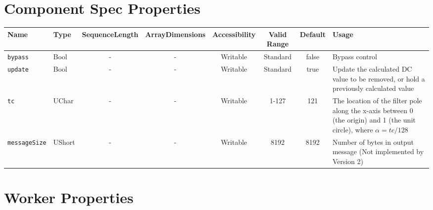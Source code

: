 \documentclass{article}
\begin{document}
\begin{landscape}
\section*{Component Spec Properties}
\begin{scriptsize}
	\begin{tabular}{|p{3cm}|p{1.5cm}|c|c|c|c|c|p{7cm}|}
		\hline
		\rowcolor{blue}
	Name               & Type   & SequenceLength & ArrayDimensions & Accessibility      & Valid Range & Default & Usage                                                                                                                    \\
		\hline
		\verb+bypass+      & Bool   & -              & -               &  Writable & Standard    & false   & Bypass control \\
		\hline
		\verb+update+      & Bool   & -              & -               & Writable & Standard    & true    & Update the calculated DC value to be removed, or hold a previously calculated value                                      \\
		\hline
		\verb+tc+          & UChar  & -              & -               & Writable & 1-127       & 121     & The location of the filter pole along the x-axis between 0 (the origin) and 1 (the unit circle), where $\alpha = tc/128$ \\
		\hline
		\verb+messageSize+ & UShort & -              & -               & Writable & 8192        & 8192    & Number of bytes in output  message (Not implemented by Version 2) \\
		\hline
	\end{tabular}
\end{scriptsize}

\section*{Worker Properties}

\end{landscape}
\end{document}
